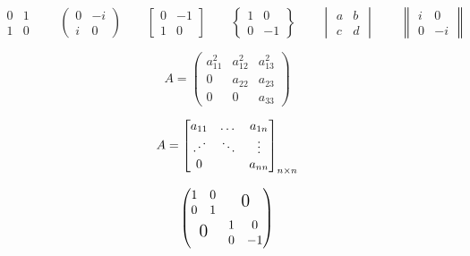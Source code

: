 \documentclass{ctexart}
\newcommand{\adots}{\mathinner{
    \mkern2mu
    \raisebox{0.1em}{.}\mkern2mu\raisebox{0.4em}{.}
    \mkern2mu\raisebox{0.7em}{.}\mkern1mu}
    }
\begin{document}
    \[
        \begin{matrix}
            0 & 1   \\
            1 & 0
        \end{matrix} \qquad
        \begin{pmatrix}
            0 & -i  \\
            i & 0
        \end{pmatrix} \qquad
        \begin{bmatrix}
            0 & -1  \\
            1 & 0
        \end{bmatrix} \qquad
        \begin{Bmatrix}
            1 & 0   \\
            0 & -1
        \end{Bmatrix} \qquad
        \begin{vmatrix}
            a & b   \\
            c & d
        \end{vmatrix} \qquad
        \begin{Vmatrix}
            i & 0   \\
            0 & -i
        \end{Vmatrix}
    \]

    \[
        A = \begin{pmatrix}
            a_{11}^2 & a_{12}^2 & a_{13}^2  \\
            0        & a_{22}   & a_{23}    \\
            0        & 0        & a_{33}
        \end{pmatrix}
    \]

    \[
        A = \begin{bmatrix}
            a_{11} & \dots  & a_{1n}    \\
            \adots & \ddots & \vdots    \\
            0      &        & a_{nn}
        \end{bmatrix}_{n \times n}
    \]

    \[
        \begin{pmatrix}
            \begin{matrix}
                1 & 0   \\
                0 & 1
            \end{matrix}
            &
            \text{\Large 0}   \\

            \text{\Large 0}
            &
            \begin{matrix}
                1 & 0   \\
                0 & -1
            \end{matrix}
        \end{pmatrix}
    \]
\end{document}
